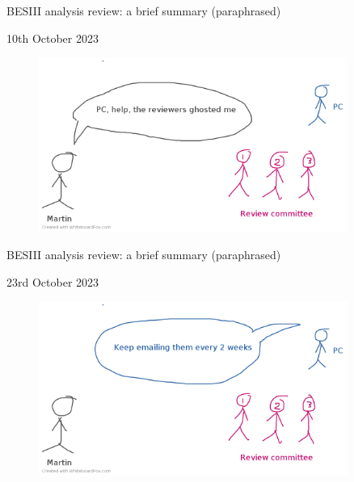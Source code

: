 \documentclass{beamer}
\begin{document}
\begin{frame}{BESIII analysis review: a brief summary (paraphrased)}
  \begin{center}
    {\large 10th October 2023\phantom{p}}
  \end{center}
  \begin{figure}
    \includegraphics[width=0.9\textwidth,trim={0 0 0 0.5cm},clip=true]{Plots/BESIII_review_process_7.png}
  \end{figure}
\end{frame}

\begin{frame}{BESIII analysis review: a brief summary (paraphrased)}
  \begin{center}
    {\large 23rd October 2023\phantom{p}}
  \end{center}
  \begin{figure}
    \includegraphics[width=0.9\textwidth,trim={0 0 0 0.5cm},clip=true]{Plots/BESIII_review_process_8.png}
  \end{figure}
\end{frame}
\end{document}
